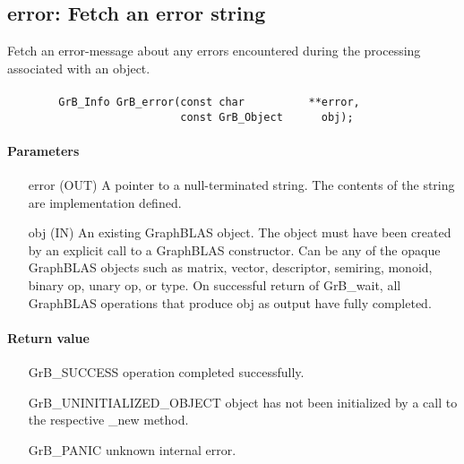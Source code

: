 \subsection{{\sf error}: Fetch an error string}
\label{Sec:GrB_error}

Fetch an error-message about any errors encountered during the processing associated with an object.

\paragraph{\syntax}

\begin{verbatim}
        GrB_Info GrB_error(const char          **error,
                           const GrB_Object      obj);
\end{verbatim}

\paragraph{Parameters}

\begin{itemize}[leftmargin=1.1in]
	\item[{\sf error}] ({\sf OUT}) A pointer to a null-terminated
		string. The contents of the string are implementation
		defined.

        \item[{\sf obj}] ({\sf IN}) An existing GraphBLAS object.
        The object must have been created by an explicit call to a
        GraphBLAS constructor.  Can be any of the opaque GraphBLAS
        objects such as matrix, vector, descriptor, semiring, monoid,
        binary op, unary op, or type. On successful return of {\sf
        GrB\_wait}, all GraphBLAS operations that produce {\sf obj}
        as output have fully completed.
\end{itemize}


\paragraph{Return value}
\begin{itemize}[leftmargin=2.3in]
	\item[{\sf GrB\_SUCCESS}]                operation completed successfully.
	\item[{\sf GrB\_UNINITIALIZED\_OBJECT}]  object has not been initialized by a call to the respective {\sf *\_new} method.
	\item[{\sf GrB\_PANIC}]                  unknown internal error.
\end{itemize}

